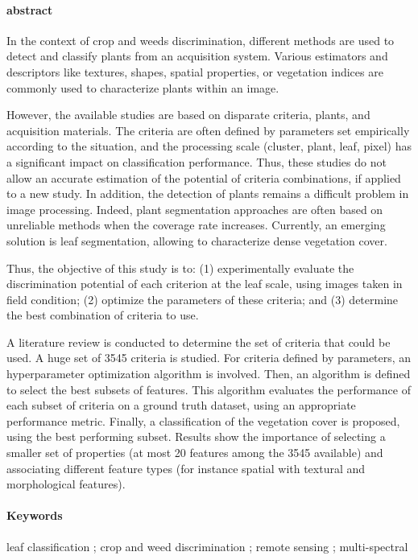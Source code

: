 \documentclass[../thesis.tex]{subfiles}
\begin{document}
	\paragraph{abstract} In the context of crop and weeds discrimination, different methods are used to detect and classify plants from an acquisition system. Various estimators and descriptors like textures, shapes, spatial properties, or vegetation indices are commonly used to characterize plants within an image. 
    
    However, the available studies are based on disparate criteria, plants, and acquisition materials. The criteria are often defined by parameters set empirically according to the situation, and the processing scale (cluster, plant, leaf, pixel) has a significant impact on classification performance. Thus, these studies do not allow an accurate estimation of the potential of criteria combinations, if applied to a new study. In addition, the detection of plants remains a difficult problem in image processing. Indeed, plant segmentation approaches are often based on unreliable methods when the coverage rate increases. Currently, an emerging solution is leaf segmentation, allowing to characterize dense vegetation cover. 
    
    Thus, the objective of this study is to: (1) experimentally evaluate the discrimination potential of each criterion at the leaf scale, using images taken in field condition; (2) optimize the parameters of these criteria; and (3) determine the best combination of criteria to use.
    
    A literature review is conducted to determine the set of criteria that could be used. A huge set of 3545 criteria is studied. For criteria defined by parameters, an hyperparameter optimization algorithm is involved. Then, an algorithm is defined to select the best subsets of features. This algorithm evaluates the performance of each subset of criteria on a ground truth dataset, using an appropriate performance metric. Finally, a classification of the vegetation cover is proposed, using the best performing subset. Results show the importance of selecting a smaller set of properties (at most 20 features among the 3545 available) and associating different feature types (for instance spatial with textural and morphological features). 
		
	\paragraph{Keywords} leaf classification ; crop and weed discrimination ; remote sensing ; multi-spectral
    \vfill
	
\end{document}
